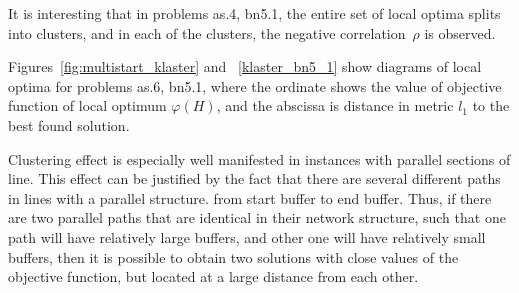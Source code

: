 \documentclass{ifacconf}
\begin{document}
It is interesting that in problems as.4, bn5.1, the entire set of local optima splits
into clusters, and in each of the clusters, the negative correlation~$\rho$ is observed.

Figures~\ref{fig:multistart_klaster} and ~\ref{klaster_bn5_1} show diagrams of local optima for problems
as.6, bn5.1, where the ordinate shows the value of objective function of local optimum $\varphi(H)$, and the abscissa is
distance in metric $l_1$ to the best found solution.

Clustering effect is especially well manifested in instances with parallel sections of line.
This effect can be justified by the  fact that there are several different paths in lines with a parallel structure.
from start buffer to end buffer. Thus, if there are two parallel paths that are identical in their network structure,
such that one path will have relatively large buffers, and other one will have relatively small buffers, then 
it is possible to obtain two solutions with close values of the objective function, but located at a large distance from each other.
\end{document}
